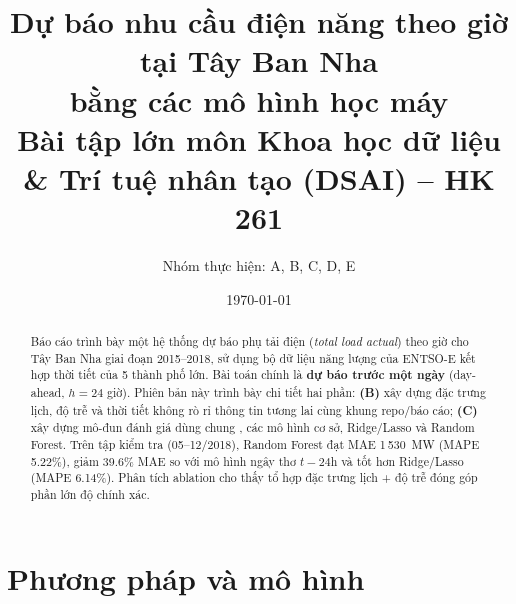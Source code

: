 \documentclass[12pt,a4paper]{article}
\title{\textbf{Dự báo nhu cầu điện năng theo giờ tại Tây Ban Nha\\bằng các mô hình học máy}\\[4pt]
\large Bài tập lớn môn Khoa học dữ liệu \& Trí tuệ nhân tạo (DSAI) -- HK 261}
\author{Nhóm thực hiện: A, B, C, D, E}
\date{\today}
\newcommand{\code}[1]{\texttt{\detokenize{#1}}}
\begin{document}
\maketitle
\thispagestyle{empty}

\begin{abstract}
\noindent Báo cáo trình bày một hệ thống dự báo phụ tải điện (\emph{total load actual}) theo giờ cho
Tây Ban Nha giai đoạn 2015--2018, sử dụng bộ dữ liệu năng lượng của ENTSO-E kết hợp thời tiết của
5 thành phố lớn. Bài toán chính là \textbf{dự báo trước một ngày} (day-ahead, $h=24$ giờ). Phiên bản này
trình bày chi tiết hai phần: \textbf{(B)} xây dựng đặc trưng lịch, độ trễ và thời tiết không rò rỉ thông tin
tương lai cùng khung repo/báo cáo; \textbf{(C)} xây dựng mô-đun đánh giá dùng chung \code{evaluate.py},
các mô hình cơ sở, Ridge/Lasso và Random Forest. Trên tập kiểm tra (05--12/2018), Random Forest đạt
MAE 1\,530~MW (MAPE 5.22\%), giảm 39.6\% MAE so với mô hình ngây thơ $t-24$h và tốt hơn Ridge/Lasso
(MAPE 6.14\%). Phân tích ablation cho thấy tổ hợp đặc trưng lịch + độ trễ đóng góp phần lớn độ chính xác.
\end{abstract}

\tableofcontents
\newpage




\section{Phương pháp và mô hình}\label{sec:methods}











\appendix

\end{document}
